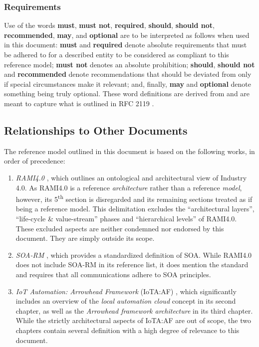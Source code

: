 \subsubsection{Requirements}

Use of the words \textbf{must}, \textbf{must not}, \textbf{required}, \textbf{should}, \textbf{should not}, \textbf{recommended}, \textbf{may}, and \textbf{optional} are to be interpreted as follows when used in this document: \textbf{must} and \textbf{required} denote absolute requirements that must be adhered to for a described entity to be considered as compliant to this reference model; \textbf{must not} denotes an absolute prohibition; \textbf{should}, \textbf{should not} and \textbf{recommended} denote recommendations that should be deviated from only if special circumstances make it relevant; and, finally, \textbf{may} and \textbf{optional} denote something being truly optional.
These word definitions are derived from and are meant to capture what is outlined in RFC 2119 \cite{bradner1997keywords}.

\subsection{Relationships to Other Documents}
\label{sec:introduction:relationships}

The reference model outlined in this document is based on the following works, in order of precedence:

\begin{enumerate}
\item \textit{RAMI4.0} \cite{adolphs2016reference}, which outlines an ontological and architectural view of Industry 4.0.
As RAMI4.0 is a reference \textit{architecture} rather than a reference \textit{model}, however, its 5\textsuperscript{th} section is disregarded and its remaining sections treated as if being a reference model.
This delimitation excludes the ``architectural layers'', ``life-cycle \& value-stream'' phases and ``hierarchical levels'' of RAMI4.0.
These excluded aspects are neither condemned nor endorsed by this document.
They are simply outside its scope. 

\item \textit{SOA-RM} \cite{mackenzie2006reference}, which provides a standardized definition of SOA.
While RAMI4.0 does not include SOA-RM in its reference list, it does mention the standard and requires that all communications adhere to SOA principles. 

\item \textit{IoT Automation: Arrowhead Framework} (IoTA:AF) \cite{delsing2017iot}, which significantly includes an overview of the \textit{local automation cloud} concept in its second chapter, as well as the \textit{Arrowhead framework architecture} in its third chapter.
While the strictly architectural aspects of IoTA:AF are out of scope, the two chapters contain several definition with a high degree of relevance to this document.

\end{enumerate}


